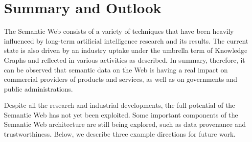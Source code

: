 \documentclass[a4paper,USenglish]{tgdk-v2021}
\begin{document}
\section{Summary and Outlook}

The Semantic Web consists of a variety of techniques that have been heavily influenced by long-term artificial intelligence research and its results.
The current state is also driven by an industry uptake under the umbrella term of Knowledge Graphs and reflected in various activities as described.
In summary, therefore, it can be observed that semantic data on the Web is having a real impact on commercial providers of products and services, as well as on governments and public administrations.

Despite all the research and industrial developments, the full potential of the Semantic Web has not yet been exploited.
Some important components of the Semantic Web architecture are still being explored, such as data provenance and trustworthiness.
Below, we describe three example directions for future work.
\end{document}
